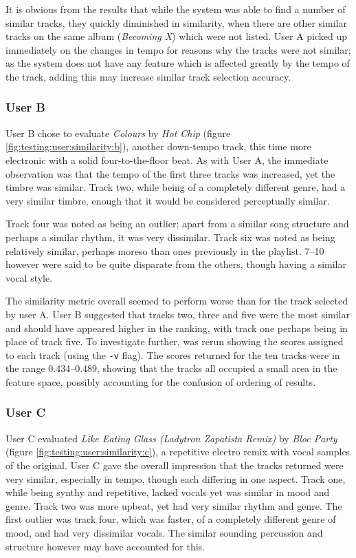 It is obvious from the results that while the system was able to find a number of similar tracks, they quickly diminished in similarity, when there are other similar tracks on the same album (\emph{Becoming X}) which were not listed. User A picked up immediately on the changes in tempo for reasons why the tracks were not similar; as the system does not have any feature which is affected greatly by the tempo of the track, adding this may increase similar track selection accuracy.
\subsubsection{User B}
User B chose to evaluate \emph{Colours} by \emph{Hot Chip} (figure \ref{fig:testing:user:similarity:b}), another down-tempo track, this time more electronic with a solid four-to-the-floor beat. As with User A, the immediate observation was that the tempo of the first three tracks was increased, yet the timbre was similar. Track two, while being of a completely different genre, had a very similar timbre, enough that it would be considered perceptually similar.


Track four was noted as being an outlier; apart from a similar song structure and perhaps a similar rhythm, it was very dissimilar. Track six was noted as being relatively similar, perhaps moreso than ones previously in the playlist. 7--10 however were said to be quite disparate from the others, though having a similar vocal style.

The similarity metric overall seemed to perform worse than for the track selected by user A. User B suggested that tracks two, three and five were the most similar and should have appeared higher in the ranking, with track one perhaps being in place of track five. To investigate further,  was rerun showing the scores assigned to each track (using the \texttt{-v} flag). The scores returned for the ten tracks were in the range 0.434--0.489, showing that the tracks all occupied a small area in the feature space, possibly accounting for the confusion of ordering of results.
\subsubsection{User C}
User C evaluated \emph{Like Eating Glass (Ladytron Zapatista Remix)} by \emph{Bloc Party} (figure \ref{fig:testing:user:similarity:c}), a repetitive electro remix with vocal samples of the original. User C gave the overall impression that the tracks returned were very similar, especially in tempo, though each differing in one aspect. Track one, while being synthy and repetitive, lacked vocals yet was similar in mood and genre. Track two was more upbeat, yet had very similar rhythm and genre. The first outlier was track four, which was faster, of a completely different genre of mood, and had very dissimilar vocals. The similar sounding percussion and structure however may have accounted for this.


